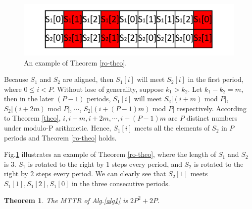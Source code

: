 \documentclass[10pt, conference, letterpaper]{IEEEtran}
\newtheorem{theorem}{Theorem}
\begin{document}
\begin{figure}[!t]
\centering
\includegraphics[width=1\columnwidth]{rotate-theo}
\caption{An example of Theorem {\ref{ro-theo}}.}
\label{exp-rotheo}
\end{figure}

\begin{IEEEproof}
Because $S_1$ and $S_2$ are aligned, then $S_1[i]$ will meet $S_2[i]$ in the first period, where $0 \le i < P$. Without lose of generality, suppose $k_1 > k_2$. Let $k_1 - k_2 = m$, then in the later $(P-1)$ periods, $S_1[i]$ will meet $S_2[(i + m)$ mod $P]$, $S_2[(i + 2m)$ mod $P]$, $\cdots$, $S_2[(i+(P-1)m)$ mod $P]$ respectively. According to Theorem \ref{theo}, $i, i + m, i + 2m, \cdots, i + (P-1)m$ are $P$ distinct numbers under modulo-P arithmetic.  Hence, $S_1[i]$ meets all the elements of $S_2$ in $P$ periods and Theorem \ref{ro-theo} holds.
\end{IEEEproof}
Fig.\ref{exp-rotheo} illustrates an example of Theorem {\ref{ro-theo}}, where the length of $S_1$ and $S_2$ is $3$. $S_1$ is rotated to the right by $1$ steps every period, and $S_2$ is rotated to the right by $2$ steps every period. We can clearly see that $S_2[1]$ meets $S_1[1],S_1[2],S_1[0]$ in the three consecutive periods.

\begin{theorem}
\label{theo-alg1}
The MTTR of Alg.\ref{alg1} is $2P^2 + 2P$.
\end{theorem}
\end{document}
